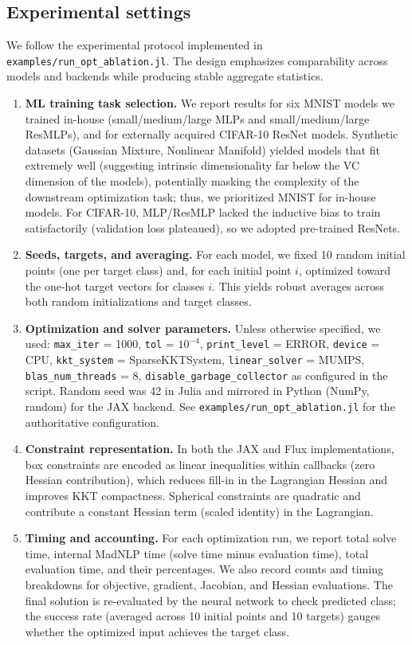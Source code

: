 \documentclass[11pt]{article}
\begin{document}
\subsection{Experimental settings}
We follow the experimental protocol implemented in \texttt{examples/run\_opt\_ablation.jl}. The design emphasizes comparability across models and backends while producing stable aggregate statistics.
\begin{enumerate}[leftmargin=1.5em]
  \item \textbf{ML training task selection.} We report results for six MNIST models we trained in-house (small/medium/large MLPs and small/medium/large ResMLPs), and for externally acquired CIFAR-10 ResNet models. Synthetic datasets (Gaussian Mixture, Nonlinear Manifold) yielded models that fit extremely well (suggesting intrinsic dimensionality far below the VC dimension of the models), potentially masking the complexity of the downstream optimization task; thus, we prioritized MNIST for in-house models. For CIFAR-10, MLP/ResMLP lacked the inductive bias to train satisfactorily (validation loss plateaued), so we adopted pre-trained ResNets.
  \item \textbf{Seeds, targets, and averaging.} For each model, we fixed 10 random initial points (one per target class) and, for each initial point $i$, optimized toward the one-hot target vectors for classes $i$. This yields robust averages across both random initializations and target classes.
  \item \textbf{Optimization and solver parameters.} Unless otherwise specified, we used: \texttt{max\_iter} = 1000, \texttt{tol} = $10^{-4}$, \texttt{print\_level} = ERROR, \texttt{device} = CPU, \texttt{kkt\_system} = SparseKKTSystem, \texttt{linear\_solver} = MUMPS, \texttt{blas\_num\_threads} = 8, \texttt{disable\_garbage\_collector} as configured in the script. Random seed was 42 in Julia and mirrored in Python (NumPy, random) for the JAX backend. See \texttt{examples/run\_opt\_ablation.jl} for the authoritative configuration.
  \item \textbf{Constraint representation.} In both the JAX and Flux implementations, box constraints are encoded as linear inequalities within callbacks (zero Hessian contribution), which reduces fill-in in the Lagrangian Hessian and improves KKT compactness. Spherical constraints are quadratic and contribute a constant Hessian term (scaled identity) in the Lagrangian.
  \item \textbf{Timing and accounting.} For each optimization run, we report total solve time, internal MadNLP time (solve time minus evaluation time), total evaluation time, and their percentages. We also record counts and timing breakdowns for objective, gradient, Jacobian, and Hessian evaluations. The final solution is re-evaluated by the neural network to check predicted class; the success rate (averaged across 10 initial points and 10 targets) gauges whether the optimized input achieves the target class.

\end{enumerate}
\end{document}
